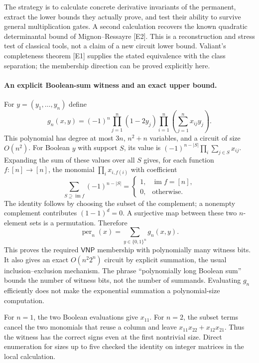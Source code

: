 \documentclass[11pt]{article}
\begin{document}
The strategy is to calculate concrete derivative invariants of the
permanent, extract the lower bounds they actually prove, and test their
ability to survive general multiplication gates. A second calculation
recovers the known quadratic determinantal bound of Mignon--Ressayre
[E2]. This is a reconstruction and stress test of classical tools, not
a claim of a new circuit lower bound. Valiant's completeness theorem
[E1] supplies the stated equivalence with the class separation; the
membership direction can be proved explicitly here.

\paragraph{An explicit Boolean-sum witness and an exact upper bound.}
For $y=(y_1,\ldots,y_n)$ define
\begin{equation}\label{vp:witness}
 g_n(x,y)=(-1)^n\prod_{j=1}^n(1-2y_j)
                   \prod_{i=1}^n\left(\sum_{j=1}^n x_{ij}y_j\right).
\end{equation}
This polynomial has degree at most $3n$, $n^2+n$ variables, and a
circuit of size $O(n^2)$. For Boolean $y$ with support $S$,
its value is $(-1)^{n-|S|}\prod_i\sum_{j\in S}x_{ij}$. Expanding the
sum of these values over all $S$ gives, for each function
$f:[n]\to[n]$, the monomial $\prod_i x_{i,f(i)}$ with coefficient
\[
 \sum_{S\supseteq\operatorname{im}f}(-1)^{n-|S|}
 =\begin{cases}1,&\operatorname{im}f=[n],\\0,&\text{otherwise}.
 \end{cases}
\]
The identity follows by choosing the subset of the complement; a
nonempty complement contributes $(1-1)^d=0$. A surjective map between
these two $n$-element sets is a permutation. Therefore
\begin{equation}\label{vp:boolean}
 \operatorname{per}_n(x)=\sum_{y\in\{0,1\}^n}g_n(x,y).
\end{equation}
This proves the required $\mathsf{VNP}$ membership with polynomially
many witness bits. It also gives an exact $O(n^2 2^n)$ circuit by
explicit summation, the usual inclusion--exclusion mechanism.
The phrase ``polynomially long Boolean sum'' bounds the number of
witness bits, not the number of summands. Evaluating $g_n$ efficiently
does not make the exponential summation a polynomial-size computation.

For $n=1$, the two Boolean evaluations give $x_{11}$. For $n=2$,
the subset terms cancel the two monomials that reuse a column and leave
$x_{11}x_{22}+x_{12}x_{21}$. Thus the witness has the correct signs
even at the first nontrivial size. Direct enumeration for sizes up to
five checked the identity on integer matrices in the local calculation.
\end{document}
